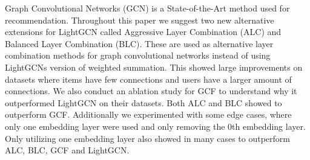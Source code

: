 Graph Convolutional Networks (GCN) is a State-of-the-Art method used for recommendation.
Throughout this paper we suggest two new alternative extensions for LightGCN called Aggressive Layer Combination (ALC) and Balanced Layer Combination (BLC).
These are used as alternative layer combination methods for graph convolutional networks instead of using LightGCNs version of weighted summation.
This showed large improvements on datasets where items have few connections and users have a larger amount of connections.
We also conduct an ablation study for GCF to understand why it outperformed LightGCN on their datasets.
Both ALC and BLC showed to outperform GCF.
Additionally we experimented with some edge cases, where only one embedding layer were used and only removing the 0th embedding layer.
Only utilizing one embedding layer also showed in many cases to outperform ALC, BLC, GCF and LightGCN.
